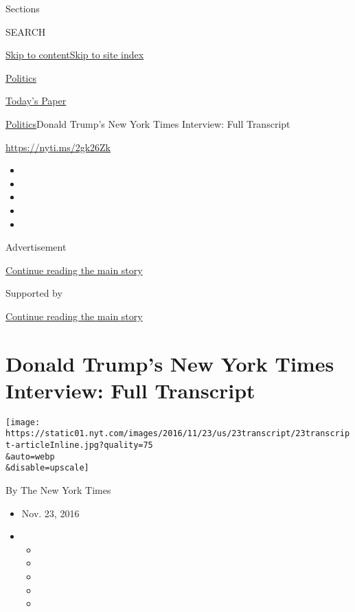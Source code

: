 Sections

SEARCH

\protect\hyperlink{site-content}{Skip to
content}\protect\hyperlink{site-index}{Skip to site index}

\href{https://www.nytimes.com/section/politics}{Politics}

\href{https://myaccount.nytimes.com/auth/login?response_type=cookie\&client_id=vi}{}

\href{https://www.nytimes.com/section/todayspaper}{Today's Paper}

\href{/section/politics}{Politics}\textbar{}Donald Trump's New York
Times Interview: Full Transcript

\url{https://nyti.ms/2gk26Zk}

\begin{itemize}
\item
\item
\item
\item
\item
\end{itemize}

Advertisement

\protect\hyperlink{after-top}{Continue reading the main story}

Supported by

\protect\hyperlink{after-sponsor}{Continue reading the main story}

\hypertarget{donald-trumps-new-york-times-interview-full-transcript}{%
\section{Donald Trump's New York Times Interview: Full
Transcript}\label{donald-trumps-new-york-times-interview-full-transcript}}

\texttt{[image: https://static01.nyt.com/images/2016/11/23/us/23transcript/23transcript-articleInline.jpg?quality=75\\\&auto=webp\\\&disable=upscale]}

By The New York Times

\begin{itemize}
\item
  Nov. 23, 2016
\item
  \begin{itemize}
  \item
  \item
  \item
  \item
  \item
  \end{itemize}
\end{itemize}

